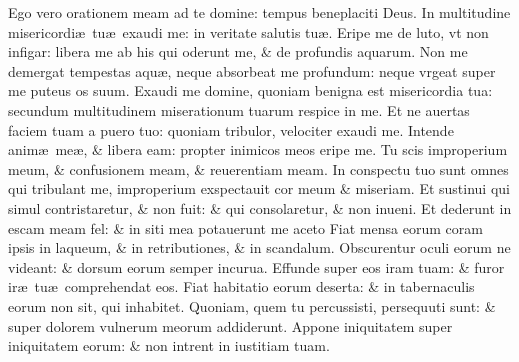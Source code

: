 \documentclass[a5paper,10pt]{book}
\def\ae{æ}
\begin{document}
\begin{multicols*}{2}
\newline \color{red} E\color{black}go vero orationem meam ad te domine: tempus beneplaciti Deus.
\newline \color{red} I\color{black}n multitudine misericordi\ae \ tu\ae \ exaudi me: in veritate salutis tu\ae .
\newline \color{red} E\color{black}ripe me de luto, vt non infigar: libera me ab his qui oderunt me, \& de profundis aquarum.
\newline \color{red} N\color{black}on me demergat tempestas aqu\ae , neque absorbeat me profundum: neque vrgeat super me puteus os suum.
\newline \color{red} E\color{black}xaudi me domine, quoniam benigna est misericordia tua: secundum multitudinem miserationum tuarum respice in me.
\newline \color{red} E\color{black}t ne auertas faciem tuam a puero tuo: quoniam tribulor, velociter exaudi me.
\newline \color{red} I\color{black}ntende anim\ae \ me\ae , \& libera eam: propter inimicos meos eripe me.
\newline \color{red} T\color{black}u scis improperium meum, \& confusionem meam, \& reuerentiam meam.
\newline \color{red} I\color{black}n conspectu tuo sunt omnes qui tribulant me, improperium exspectauit cor meum \& miseriam.
\newline \color{red} E\color{black}t sustinui qui simul contristaretur, \& non fuit: \& qui consolaretur, \& non inueni.
\newline \color{red} E\color{black}t dederunt in escam meam fel: \& in siti mea potauerunt me aceto
\newline \color{red} F\color{black}iat mensa eorum coram ipsis in laqueum, \& in retributiones, \& in scandalum.
\newline \color{red} O\color{black}bscurentur oculi eorum ne videant: \& dorsum eorum semper incurua.
\newline \color{red} E\color{black}ffunde super eos iram tuam: \& furor ir\ae \ tu\ae \ comprehendat eos.
\newline \color{red} F\color{black}iat habitatio eorum deserta: \& in tabernaculis eorum non sit, qui inhabitet.
\newline \color{red} Q\color{black}uoniam, quem tu percussisti, persequuti sunt: \& super dolorem vulnerum meorum addiderunt.
\newline \color{red} A\color{black}ppone iniquitatem super iniquitatem eorum: \& non intrent in iustitiam tuam.

\end{multicols*}
\end{document}

